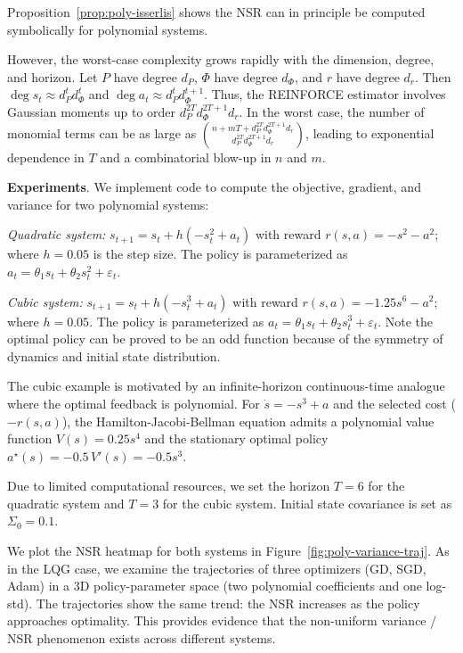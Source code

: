 Proposition~\ref{prop:poly-isserlis} shows the NSR can in principle be computed symbolically for polynomial systems. 

However, the worst-case complexity grows rapidly with the dimension, degree, and horizon. Let $P$ have degree $d_P$, $\Phi$ have degree $d_\Phi$, and $r$ have degree $d_r$. Then $\deg s_t\approx\!d_P^t d_\Phi^t$ and $\deg a_t\approx\!d_P^t d_\Phi^{t+1}$. Thus, the REINFORCE estimator involves Gaussian moments up to order $d_P^{2T} d_\Phi^{2T+1} d_r$. In the worst case, the number of monomial terms can be as large as $\binom{n + mT + d_P^{2T} d_\Phi^{2T+1} d_r}{d_P^{2T} d_\Phi^{2T+1} d_r}$, leading to exponential dependence in $T$ and a combinatorial blow-up in $n$ and $m$.

\textbf{Experiments}. We implement code to compute the objective, gradient, and variance for two polynomial systems:

\emph{Quadratic system:} $s_{t+1}=s_t+ h(-s_t^2 + a_t)$ with reward $r(s,a)=-s^2-a^2$; where $h=0.05$ is the step size. The policy is parameterized as $a_t=\theta_1 s_t + \theta_2 s_t^2 + \varepsilon_t$. 

\emph{Cubic system:} $s_{t+1}=s_t + h(-s_t^3 + a_t)$ with reward $r(s,a)=-1.25s^6 - a^2$; where $h=0.05$. The policy is parameterized as $a_t=\theta_1 s_t + \theta_2 s_t^3 + \varepsilon_t$. Note the optimal policy can be proved to be an odd function because of the symmetry of dynamics and initial state distribution.

The cubic example is motivated by an infinite-horizon continuous-time analogue where the optimal feedback is polynomial.
For $\dot s = -s^3 + a$ and the selected cost ($-r(s,a)$), the Hamilton-Jacobi-Bellman equation admits a polynomial value function $V(s)= 0.25 s^4$ and the stationary optimal policy $a^\star(s)= -0.5\,V'(s)= -0.5 s^3$.

Due to limited computational resources, we set the horizon $T=6$ for the quadratic system and $T=3$ for the cubic system. Initial state covariance is set as $\Sigma_0=0.1$.

We plot the NSR heatmap for both systems in Figure~\ref{fig:poly-variance-traj}. As in the LQG case, we examine the trajectories of three optimizers (GD, SGD, Adam) in a 3D policy-parameter space (two polynomial coefficients and one log-std). The trajectories show the same trend: the NSR increases as the policy approaches optimality. This provides evidence that the non-uniform variance / NSR phenomenon exists across different systems.

